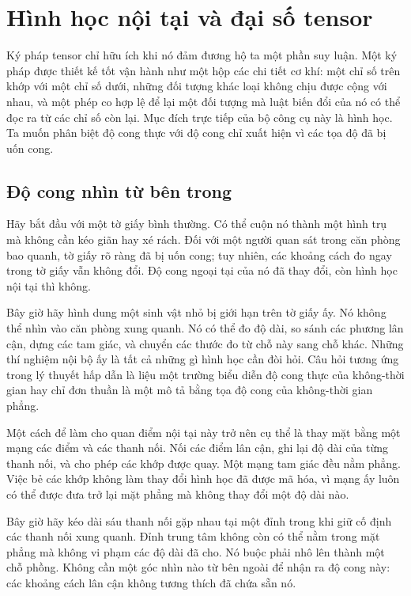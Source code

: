 \chapter{Hình học nội tại và đại số tensor}

Ký pháp tensor chỉ hữu ích khi nó đảm đương hộ ta một phần suy luận. Một ký pháp được thiết kế tốt vận hành như một hộp các chi tiết cơ khí: một chỉ số trên khớp với một chỉ số dưới, những đối tượng khác loại không chịu được cộng với nhau, và một phép co hợp lệ để lại một đối tượng mà luật biến đổi của nó có thể đọc ra từ các chỉ số còn lại. Mục đích trực tiếp của bộ công cụ này là hình học. Ta muốn phân biệt độ cong thực với độ cong chỉ xuất hiện vì các tọa độ đã bị uốn cong.

\section{Độ cong nhìn từ bên trong}

Hãy bắt đầu với một tờ giấy bình thường. Có thể cuộn nó thành một hình trụ mà không cần kéo giãn hay xé rách. Đối với một người quan sát trong căn phòng bao quanh, tờ giấy rõ ràng đã bị uốn cong; tuy nhiên, các khoảng cách đo ngay trong tờ giấy vẫn không đổi. Độ cong ngoại tại của nó đã thay đổi, còn hình học nội tại thì không.

Bây giờ hãy hình dung một sinh vật nhỏ bị giới hạn trên tờ giấy ấy. Nó không thể nhìn vào căn phòng xung quanh. Nó có thể đo độ dài, so sánh các phương lân cận, dựng các tam giác, và chuyển các thước đo từ chỗ này sang chỗ khác. Những thí nghiệm nội bộ ấy là tất cả những gì hình học cần đòi hỏi. Câu hỏi tương ứng trong lý thuyết hấp dẫn là liệu một trường biểu diễn độ cong thực của không-thời gian hay chỉ đơn thuần là một mô tả bằng tọa độ cong của không-thời gian phẳng.

Một cách để làm cho quan điểm nội tại này trở nên cụ thể là thay mặt bằng một mạng các điểm và các thanh nối. Nối các điểm lân cận, ghi lại độ dài của từng thanh nối, và cho phép các khớp được quay. Một mạng tam giác đều nằm phẳng. Việc bẻ các khớp không làm thay đổi hình học đã được mã hóa, vì mạng ấy luôn có thể được đưa trở lại mặt phẳng mà không thay đổi một độ dài nào.

Bây giờ hãy kéo dài sáu thanh nối gặp nhau tại một đỉnh trong khi giữ cố định các thanh nối xung quanh. Đỉnh trung tâm không còn có thể nằm trong mặt phẳng mà không vi phạm các độ dài đã cho. Nó buộc phải nhô lên thành một chỗ phồng. Không cần một góc nhìn nào từ bên ngoài để nhận ra độ cong này: các khoảng cách lân cận không tương thích đã chứa sẵn nó.

